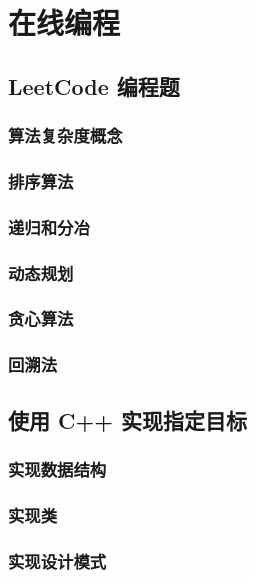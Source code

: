 \documentclass[cn,10pt,math=newtx,citestyle=gb7714-2015,bibstyle=gb7714-2015]{elegantbook}
\begin{document}
\chapter{在线编程}

\section{LeetCode 编程题}

\subsection{算法复杂度概念}

\subsection{排序算法}

\subsection{递归和分冶}

\subsection{动态规划}

\subsection{贪心算法}

\subsection{回溯法}

\section{使用 C++ 实现指定目标}

\subsection{实现数据结构}

\subsection{实现类}

\subsection{实现设计模式}
\end{document}
